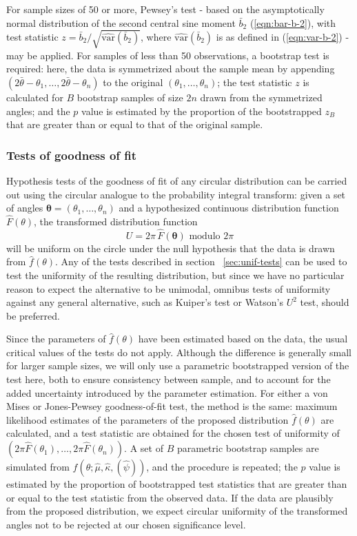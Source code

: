\documentclass[../../ArchStats.tex]{subfiles}
\begin{document}
For sample sizes of 50 or more, Pewsey's test\cite{Pewsey2002} - based on the asymptotically normal distribution of the second central sine moment $\bar{b}_2$ (\ref{eqn:bar-b-2}), with test statistic $z = \bar{b}_2 / \sqrt{\widehat{\text{var}}(\bar{b}_2)}$, where $\widehat{\text{var}}(\bar{b}_2)$ is as defined in (\ref{eqn:var-b-2}) - may be applied. For samples of less than 50 observations, a bootstrap test is required: here, the data is symmetrized about the sample mean by appending $(2\bar{\theta} - \theta_1, \dots, 2\bar{\theta} - \theta_n)$ to the original $(\theta_1, \dots, \theta_n)$; the test statistic $z$ is calculated for $B$ bootstrap samples of size $2n$ drawn from the symmetrized angles; and the $p$ value is estimated by the proportion of the bootstrapped $z_B$ that are greater than or equal to that of the original sample.

\subsubsection{Tests of goodness of fit}
\label{sec:GoF}

Hypothesis tests of the goodness of fit of any circular distribution can be carried out using the circular analogue to the probability integral transform: given a set of angles $\mathbf{\theta} = (\theta_1, \dots, \theta_n)$ and a hypothesized continuous distribution function $\hat{F}(\theta)$, the transformed distribution function
\begin{equation}
U = 2\pi \, \hat{F}(\mathbf{\theta}) \text{ modulo } 2\pi
\end{equation}
will be uniform on the circle under the null hypothesis that the data is drawn from $\hat{f}(\theta)$. Any of the tests described in section ~\ref{sec:unif-tests} can be used to test the uniformity of the resulting distribution, but since we have no particular reason to expect the alternative to be unimodal, omnibus tests of uniformity against any general alternative, such as Kuiper's test or Watson's $U^2$ test, should be preferred.

Since the parameters of $\hat{f}(\theta)$ have been estimated based on the data, the usual critical values of the tests do not apply. Although the difference is generally small for larger sample sizes, we will only use a parametric bootstrapped version of the test here,  both to ensure consistency between sample, and to account for the added uncertainty introduced by the parameter estimation. For either a von Mises or Jones-Pewsey goodness-of-fit test, the method is the same: maximum likelihood estimates of the parameters of the proposed distribution $\hat{f}(\theta)$ are calculated, and a test statistic are obtained for the chosen test of uniformity of $( 2\pi \hat{F}(\theta_1), \dots, 2\pi \hat{F}(\theta_n) )$. A set of $B$ parametric bootstrap samples are simulated from $\hat{f}(\theta; \hat{\mu}, \hat{\kappa}, (\hat{\psi}))$, and the procedure is repeated; the $p$ value is estimated by the proportion of bootstrapped test statistics that are greater than or equal to the test statistic from the observed data. If the data are plausibly from the proposed distribution, we expect circular uniformity of the transformed angles not to be rejected at our chosen significance level.
\end{document}
